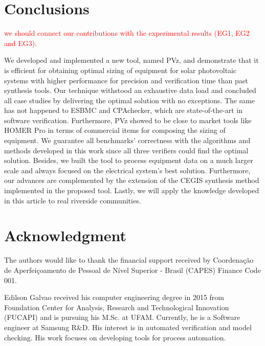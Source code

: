 \documentclass[journal]{IEEEtran}
\begin{document}
\section{Conclusions} 

\textcolor{red}{we should connect our contributions with the experimental results (EG1, EG2 and EG3).}

We developed and implemented a new tool, named PVz, and demonstrate that it is efficient for obtaining optimal sizing of equipment for solar photovoltaic systems with higher performance for precision and verification time than past synthesis tools. Our technique withstood an exhaustive data load and concluded all case studies by delivering the optimal solution with no exceptions. The same has not happened to ESBMC and CPAchecker, which are state-of-the-art in software verification. Furthermore, PVz showed to be close to market tools like HOMER Pro in terms of commercial items for composing the sizing of equipment. 
We guarantee all benchmarks' correctness with the algorithms and methods developed in this work since all three verifiers could find the optimal solution. Besides, we built the tool to process equipment data on a much larger scale and always focused on the electrical system's best solution. Furthermore, our advances are complemented by the extension of the CEGIS synthesis method implemented in the proposed tool. Lastly, we will apply the knowledge developed in this article to real riverside communities.


\section*{Acknowledgment}
The authors would like to thank the financial support received by Coordenação de Aperfeiçoamento de Pessoal de Nível Superior - Brasil (CAPES) Finance Code 001.

\ifCLASSOPTIONcaptionsoff
  \newpage
\fi


%


\begin{IEEEbiography}
    {Edilson Galvao} received his computer engineering degree in 2015 from Foundation Center for Analysis, Research and Technological Innovation (FUCAPI) and is pursuing his M.Sc. at UFAM. Currently, he is a Software engineer at Samsung R\&D. His interest is in automated verification and model checking. His work focuses on developing tools for process automation.
\end{IEEEbiography}
\end{document}
